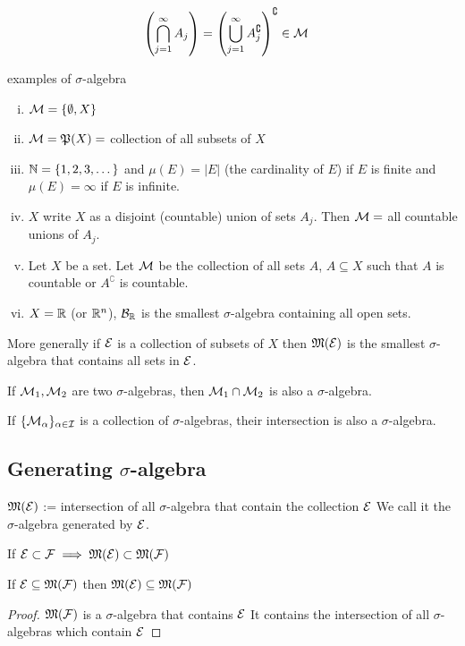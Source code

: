 \begin{remark}
  \begin{align*}
    \left(\bigcap_{j=1}^\infty A_j\right) &= \left(\bigcup_{j=1}^\infty A_j^\complement\right)^\complement \in \mathcal M
  \end{align*} 
\end{remark}
\begin{example}
  examples of $\sigma$-algebra
  \begin{enumerate}[(i)]
    \item $\mathcal M = \{\emptyset, X\}$ 
    \item $\mathcal M = \mathfrak P(X) = $ collection of all subsets of $X$
    \item[] $\mathbb N = \{1, 2, 3, \dotsc\}$ and $\mu(E) = |E|$ (the cardinality of $E$) if $E$ is finite and 
    $\mu(E) = \infty$ if $E$ is infinite.
    \item $X$ write $X$ as a disjoint (countable) union of sets $A_j$. Then
    $\mathcal M = $ all countable unions of $A_j$. 
    \item Let $X$ be a set. Let $\mathcal M$ be the collection of all sets $A$, $A \subseteq X$ such that
    $A$ is countable or $A^\complement$ is countable.
    \item $X = \mathbb R$ (or $\mathbb R^n$), $\mathcal B_\mathbb R$ is the smallest $\sigma$-algebra containing all open sets.
  \end{enumerate}
\end{example}

More generally if $\mathcal E$ is a collection of subsets of $X$ then $\mathfrak M(\mathcal E)$ is the smallest
$\sigma$-algebra that contains all sets in $\mathcal E$.

If $\mathcal M_1, \mathcal M_2$ are two $\sigma$-algebras, then $\mathcal M_1 \cap \mathcal M_2$ is also a 
$\sigma$-algebra.

If $\{\mathcal M_\alpha\}_{\alpha \in \mathcal{I}}$ is a collection of $\sigma$-algebras, their intersection is also a $\sigma$-algebra.

\subsection{Generating $\sigma$-algebra}

\begin{definition}
$\mathfrak M(\mathcal E)$ := intersection of all $\sigma$-algebra that contain the collection $\mathcal E$
We call it the $\sigma$-algebra generated by $\mathcal E$.
\end{definition}

\begin{remark}
If $\mathcal E\subset \mathcal F \implies \mathfrak M(\mathcal E) \subset \mathfrak M(\mathcal F)$
\end{remark}
\begin{lemma}
  If $\mathcal E \subseteq \mathfrak M(\mathcal F)$ then $\mathfrak M(\mathcal E) \subseteq \mathfrak M(\mathcal F)$
\end{lemma}
\begin{proof}
  $\mathfrak M(\mathcal F)$ is a $\sigma$-algebra that contains $\mathcal E$
  It contains the intersection of all $\sigma$-algebras which contain $\mathcal E$
\end{proof}


